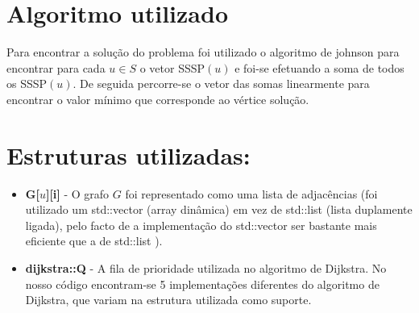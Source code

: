 \documentclass{scrartcl}
\begin{document}
\section*{Algoritmo utilizado}
Para encontrar a solução do problema foi utilizado o algoritmo de johnson para encontrar para cada $u \in S$ o vetor SSSP$(u)$ e foi-se efetuando a soma de todos os SSSP$(u)$. De seguida percorre-se o vetor das somas linearmente para encontrar o valor mínimo que corresponde ao vértice solução. \\

\section*{Estruturas utilizadas:}
\begin{itemize}
	\setlength\itemsep{-0.5ex}
	\item \textbf{G[$u$][i]} - O grafo $G$ foi representado como uma lista de adjacências (foi utilizado um std::vector (array dinâmica) em vez de std::list (lista duplamente ligada), pelo facto de a implementação do std::vector ser bastante mais eficiente que a de std::list \cite{ISOC++:2003}).
	\item \textbf{dijkstra::Q} - A fila de prioridade utilizada no algoritmo de Dijkstra. No nosso código encontram-se 5 implementações diferentes do algoritmo de Dijkstra, que variam na estrutura utilizada como suporte.
\end{itemize}
\end{document}
